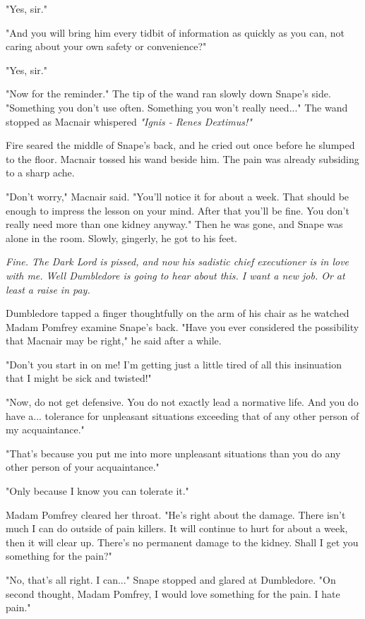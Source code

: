 "Yes, sir."

"And you will bring him every tidbit of information as quickly as you can, not caring about your own safety or convenience?"

"Yes, sir."

"Now for the reminder." The tip of the wand ran slowly down Snape's side. "Something you don't use often. Something you won't really need..." The wand stopped as Macnair whispered \emph{"Ignis - Renes Dextimus!"}

Fire seared the middle of Snape's back, and he cried out once before he slumped to the floor. Macnair tossed his wand beside him. The pain was already subsiding to a sharp ache.

"Don't worry," Macnair said. "You'll notice it for about a week. That should be enough to impress the lesson on your mind. After that you'll be fine. You don't really need more than one kidney anyway." Then he was gone, and Snape was alone in the room. Slowly, gingerly, he got to his feet.

\emph{Fine. The Dark Lord is pissed, and now his sadistic chief executioner is in love with me. Well Dumbledore is going to hear about this. I want a new job. Or at least a raise in pay.}

\sbreak

Dumbledore tapped a finger thoughtfully on the arm of his chair as he watched Madam Pomfrey examine Snape's back. "Have you ever considered the possibility that Macnair may be right," he said after a while.

"Don't you start in on me! I'm getting just a little tired of all this insinuation that I might be sick and twisted!"

"Now, do not get defensive. You do not exactly lead a normative life. And you do have a... tolerance for unpleasant situations exceeding that of any other person of my acquaintance."

"That's because you put me into more unpleasant situations than you do any other person of your acquaintance."

"Only because I know you can tolerate it."

Madam Pomfrey cleared her throat. "He's right about the damage. There isn't much I can do outside of pain killers. It will continue to hurt for about a week, then it will clear up. There's no permanent damage to the kidney. Shall I get you something for the pain?"

"No, that's all right. I can..." Snape stopped and glared at Dumbledore. "On second thought, Madam Pomfrey, I would love something for the pain. I hate pain."

